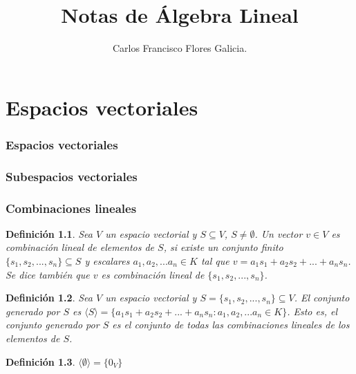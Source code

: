 \documentclass{book}
\title{Notas de Álgebra Lineal}
\author{Carlos Francisco Flores Galicia.}
\date{}
\newtheorem{definition}{Definición}
\begin{document}
\maketitle

\chapter{Espacios vectoriales}
\subsection{Espacios vectoriales}
\subsection{Subespacios vectoriales}
\subsection{Combinaciones lineales}

\begin{definition}
Sea $V$ un espacio vectorial y $S \subseteq V$, $S \neq \emptyset$. Un vector $v \in V$ es combinación lineal de elementos de $S$, si existe un conjunto finito $\{s_1,s_2,...,s_n\}\subseteq S$ y escalares $a_1,a_2,...a_n \in K$ tal que $v=a_1 s_1+a_2 s_2+...+a_n s_n$. Se dice también que $v$ es combinación lineal de $\{s_1,s_2,...,s_n\}$.
\end{definition}

\begin{definition}
Sea $V$ un espacio vectorial y $S=\{ s_1,s_2,...,s_n \} \subseteq V$. El conjunto generado por $S$ es $\langle S \rangle = \{a_1 s_1+a_2 s_2+...+a_n s_n : a_1,a_2,...a_n \in K \}$. Esto es, el conjunto generado por $S$ es el conjunto de todas las combinaciones lineales de los elementos de $S$.
\end{definition}

\begin{definition}
$\langle \emptyset \rangle=\{0_V\}$
\end{definition}
\end{document}
